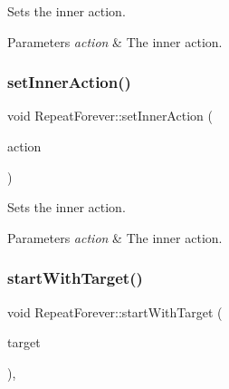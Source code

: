Sets the inner action.


\begin{DoxyParams}{Parameters}
{\em action} & The inner action. \\
\hline
\end{DoxyParams}
\mbox{\label{classRepeatForever_a7f8ea33f8ff4be43698d4bfdeab38c83}} 
\subsubsection{\texorpdfstring{set\+Inner\+Action()}{setInnerAction()}\hspace{0.1cm}{\footnotesize\ttfamily [2/2]}}
{\footnotesize\ttfamily void Repeat\+Forever\+::set\+Inner\+Action (\begin{DoxyParamCaption}\item[{\hyperlink{classActionInterval}{Action\+Interval} $\ast$}]{action }\end{DoxyParamCaption})\hspace{0.3cm}{\ttfamily [inline]}}

Sets the inner action.


\begin{DoxyParams}{Parameters}
{\em action} & The inner action. \\
\hline
\end{DoxyParams}
\mbox{\label{classRepeatForever_acdaeb5aec3a6cd6c0f3347c80634d02d}} 
\subsubsection{\texorpdfstring{start\+With\+Target()}{startWithTarget()}\hspace{0.1cm}{\footnotesize\ttfamily [1/2]}}
{\footnotesize\ttfamily void Repeat\+Forever\+::start\+With\+Target (\begin{DoxyParamCaption}\item[{\hyperlink{classNode}{Node} $\ast$}]{target }\end{DoxyParamCaption})\hspace{0.3cm}{\ttfamily [override]}, {\ttfamily [virtual]}}


